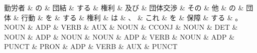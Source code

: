 \documentclass[tikz,border=5pt]{standalone}
\begin{document}
\normalsize
\begin{dependency}[edge unit distance=12.0pt]
    \begin{deptext}[column sep=1em]
        勤労者 \& の \& 団結 \& する \& 権利 \& 及び \& 団体交渉 \& その \& 他 \& の \& 団体 \& 行動 \& を \& する \& 権利 \& は \& 、 \& これ \& を \& 保障 \& する \& 。\\
        NOUN \& ADP \& VERB \& AUX \& NOUN \& CCONJ \& NOUN \& DET \& NOUN \& ADP \& NOUN \& NOUN \& ADP \& VERB \& NOUN \& ADP \& PUNCT \& PRON \& ADP \& VERB \& AUX \& PUNCT\\
    \end{deptext}
\end{dependency}
\end{document}

